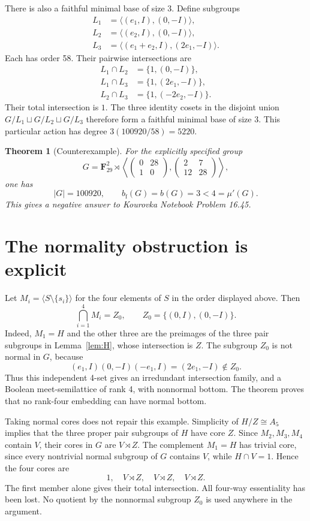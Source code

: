 \documentclass[11pt]{article}
\newtheorem{theorem}{Theorem}
\theoremstyle{remark}\newtheorem{remark}[theorem]{Remark}
\newcommand{\F}{\mathbf F}
\newcommand{\mup}{\mu'}
\newcommand{\bfth}{b_{\mathrm f}}
\begin{document}
There is also a faithful minimal base of size 3. Define subgroups
\[
\begin{split}
 L_1&=\langle(e_1,I),(0,-I)\rangle,\\
 L_2&=\langle(e_2,I),(0,-I)\rangle,\\
 L_3&=\langle(e_1+e_2,I),(2e_1,-I)\rangle.
\end{split}
\]
Each has order 58. Their pairwise intersections are
\[
\begin{split}
 L_1\cap L_2&=\{1,(0,-I)\},\\
 L_1\cap L_3&=\{1,(2e_1,-I)\},\\
 L_2\cap L_3&=\{1,(-2e_2,-I)\}.
\end{split}
\]
Their total intersection is $1$. The three identity cosets in the disjoint
union $G/L_1\sqcup G/L_2\sqcup G/L_3$ therefore form a faithful minimal base
of size 3. This particular action has degree $3(100920/58)=5220$.

\begin{theorem}[Counterexample]
For the explicitly specified group
\[
 G=\F_{29}^2\rtimes
 \left\langle
 \begin{pmatrix}0&28\\1&0\end{pmatrix},
 \begin{pmatrix}2&7\\12&28\end{pmatrix}
 \right\rangle,
\]
one has
\[
             |G|=100920,
 \qquad      \bfth(G)=b(G)=3<4=\mup(G).
\]
This gives a negative answer to Kourovka Notebook Problem 16.45.
\end{theorem}

\section{The normality obstruction is explicit}
Let $M_i=\langle S\setminus\{s_i\}\rangle$ for the four elements of $S$ in the
order displayed above. Then
\[
              \bigcap_{i=1}^4M_i=Z_0,
       \qquad Z_0=\{(0,I),(0,-I)\}.
\]
Indeed, $M_1=H$ and the other three are the preimages of the three pair
subgroups in Lemma~\ref{lem:H}, whose intersection is $Z$. The subgroup
$Z_0$ is not normal in $G$, because
\[
 (e_1,I)(0,-I)(-e_1,I)=(2e_1,-I)\notin Z_0.
\]
Thus this independent 4-set gives an irredundant intersection family, and a
Boolean meet-semilattice of rank 4, with nonnormal bottom. The theorem proves
that no rank-four embedding can have normal bottom.

Taking normal cores does not repair this example. Simplicity of $H/Z\cong A_5$
implies that the three proper pair subgroups of $H$ have core $Z$. Since
$M_2,M_3,M_4$ contain $V$, their cores in $G$ are $V\rtimes Z$.
The complement $M_1=H$ has trivial core, since every nontrivial normal
subgroup of $G$ contains $V$, while $H\cap V=1$. Hence the four cores are
\[
                   1,\quad V\rtimes Z,\quad V\rtimes Z,\quad V\rtimes Z.
\]
The first member alone gives their total intersection. All four-way
essentiality has been lost. No quotient by the nonnormal subgroup $Z_0$ is
used anywhere in the argument.
\end{document}
